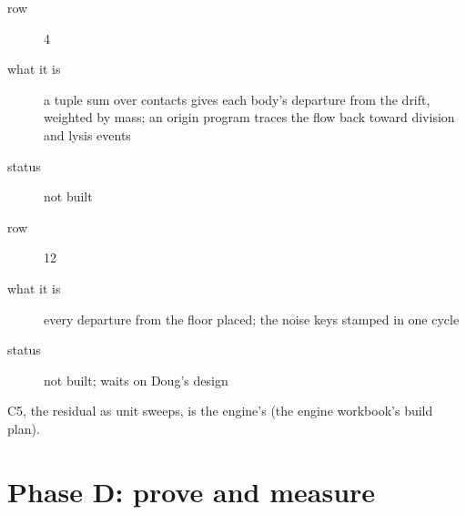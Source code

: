 \begin{description}
\item[{row}] 4
\item[{what it is}] a tuple sum over contacts gives each body's departure from the drift, weighted by mass; an origin program traces the flow back toward division and lysis events
\item[{status}] not built
\end{description}

\begin{description}
\item[{row}] 12
\item[{what it is}] every departure from the floor placed; the noise keys stamped in one cycle
\item[{status}] not built; waits on Doug's design
\end{description}

C5, the residual as unit sweeps, is the engine's (the engine workbook's build plan).

\section{\texorpdfstring{Phase D: prove and measure}{Phase D: prove and measure}}

